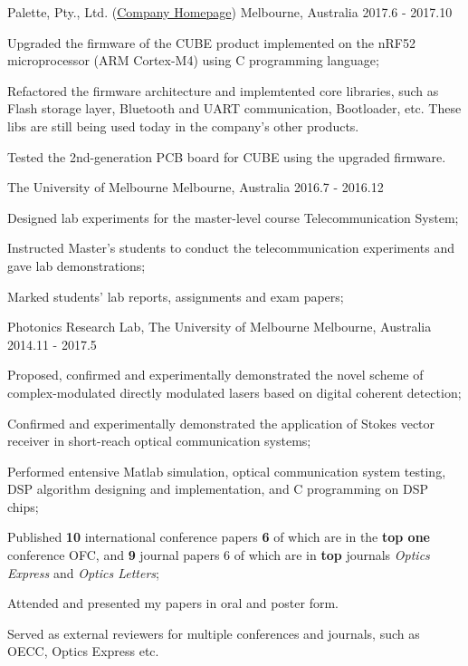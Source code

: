 \begin{cventries}
    {Palette, Pty., Ltd. (\href{https://palette.com/}{Company Homepage})}%
    {Melbourne, Australia}%
    {2017.6 - 2017.10}%
    {
      \begin{cvitems}
        \item Upgraded the firmware of the \textsc{CUBE} product implemented on the nRF52 microprocessor (ARM Cortex-M4) using C programming language;
        \item Refactored the firmware architecture and implemtented core libraries, such as Flash storage layer, Bluetooth and UART communication, Bootloader, etc. These libs are still being used today in the company's other products.
        \item Tested the 2nd-generation PCB board for \textsc{CUBE} using the upgraded firmware.
      \end{cvitems}
    }

      {The University of Melbourne}%
      {Melbourne, Australia}%
      {2016.7 - 2016.12}%
      {
        \begin{cvitems}
          \item Designed lab experiments for the master-level course Telecommunication System;
          \item Instructed Master's students to conduct the telecommunication experiments and gave lab demonstrations;
          \item Marked students' lab reports, assignments and exam papers;
        \end{cvitems}
      }

      {Photonics Research Lab, The University of Melbourne}%
      {Melbourne, Australia}%
      {2014.11 - 2017.5}%
      {
        \begin{cvitems}
          \item Proposed, confirmed and experimentally demonstrated the novel scheme of complex-modulated directly modulated lasers based on digital coherent detection;
          \item Confirmed and experimentally demonstrated the application of Stokes vector receiver in short-reach optical communication systems;
          \item Performed entensive Matlab simulation, optical communication system testing, DSP algorithm designing and implementation, and C programming on DSP chips;
          \item Published \textbf{10} international conference papers \textbf{6} of which are in the \textbf{top one} conference OFC, and \textbf{9} journal papers 6 of which are in \textbf{top} journals \textit{Optics Express} and \textit{Optics Letters};
          \item Attended and presented my papers in oral and poster form.
          \item Served as external reviewers for multiple conferences and journals, such as OECC, Optics Express etc.
        \end{cvitems}
      }


\end{cventries}
